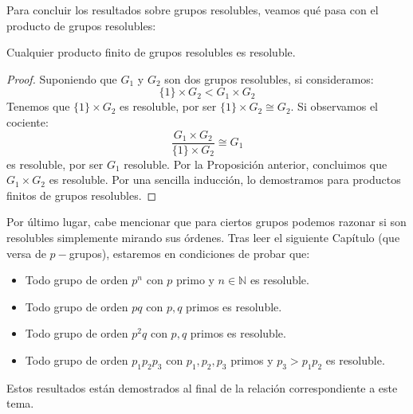 \noindent
Para concluir los resultados sobre grupos resolubles, veamos qué pasa con el producto de grupos resolubles:

\begin{coro}
    Cualquier producto finito de grupos resolubles es resoluble.
    \begin{proof}
        Suponiendo que $G_1$ y $G_2$ son dos grupos resolubles, si consideramos:
        \begin{equation*}
            \{1\} \times G_2 < G_1\times G_2
        \end{equation*}
        Tenemos que $\{1\}\times G_2$ es resoluble, por ser $\{1\}\times G_2\cong G_2$. Si observamos el cociente:
        \begin{equation*}
            \dfrac{G_1\times G_2}{\{1\}\times G_2} \cong G_1
        \end{equation*}
        es resoluble, por ser $G_1$ resoluble. Por la Proposición anterior, concluimos que $G_1\times G_2$ es resoluble. Por una sencilla inducción, lo demostramos para productos finitos de grupos resolubles.
    \end{proof}
\end{coro}

Por último lugar, cabe mencionar que para ciertos grupos podemos razonar si son resolubles simplemente mirando sus órdenes. Tras leer el siguiente Capítulo (que versa de $p-$grupos), estaremos en condiciones de probar que:
\begin{itemize}
    \item Todo grupo de orden $p^n$ con $p$ primo y $n\in \mathbb{N}$ es resoluble.
    \item Todo grupo de orden $pq$ con $p,q$ primos es resoluble.
    \item Todo grupo de orden $p^2q$ con $p,q$ primos es resoluble.
    \item Todo grupo de orden $p_1p_2p_3$ con $p_1,p_2,p_3$ primos y $p_3>p_1p_2$ es resoluble.
\end{itemize}
Estos resultados están demostrados al final de la relación correspondiente a este tema.
